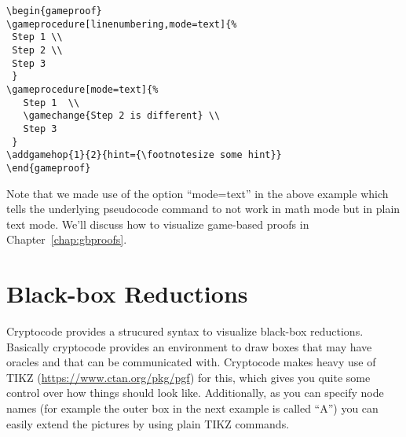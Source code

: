 \documentclass[a4paper]{report}
\begin{document}
\vspace{2\baselineskip}
\begin{center}
\begin{gameproof}
\end{gameproof}
\end{center}
\begin{lstlisting}
\begin{gameproof}
\gameprocedure[linenumbering,mode=text]{%
 Step 1 \\
 Step 2 \\
 Step 3
 }
\gameprocedure[mode=text]{%
   Step 1  \\
   \gamechange{Step 2 is different} \\
   Step 3
 }
\addgamehop{1}{2}{hint={\footnotesize some hint}}
\end{gameproof}
\end{lstlisting}
Note that we made use of the option \enquote{mode=text} in the above example which tells the underlying pseudocode
command to not work in math mode but in plain text mode. We'll discuss how to visualize game-based proofs in Chapter~\ref{chap:gbproofs}.

\section{Black-box Reductions}
Cryptocode provides a strucured syntax to visualize black-box reductions. Basically cryptocode
provides an environment to draw boxes that may have oracles and that can be communicated with.
Cryptocode makes heavy use of TIKZ (\url{https://www.ctan.org/pkg/pgf}) for this, which gives you
quite some control over how things should look like. Additionally, as you can specify node names
(for example the outer box in the next example is called \enquote{A}) you can easily extend the pictures
by using plain TIKZ commands.
\end{document}
